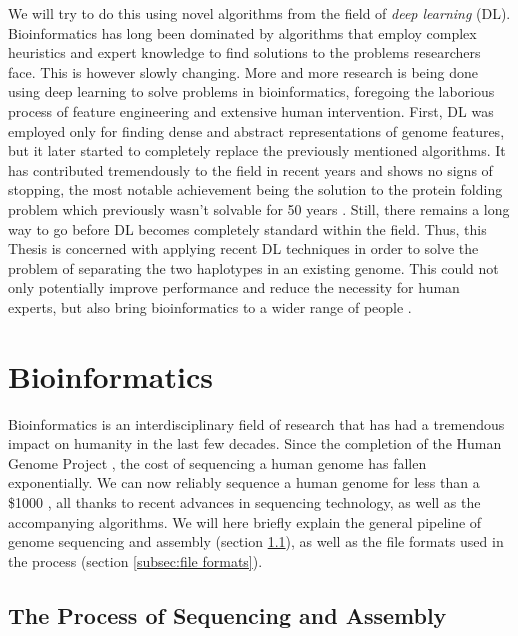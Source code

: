 \documentclass[times, utf8, diplomski, english]{fer_eng}
\begin{document}
We will try to do this using novel algorithms from the field of \textit{deep learning} (DL). Bioinformatics has long been dominated by algorithms that employ complex heuristics and expert knowledge to find solutions to the problems researchers face. This is however slowly changing. More and more research is being done using deep learning to solve problems in bioinformatics, foregoing the laborious process of feature engineering and extensive human intervention. First, DL was employed only for finding dense and abstract representations of genome features, but it later started to completely replace the previously mentioned algorithms. It has contributed tremendously to the field in recent years and shows no signs of stopping, the most notable achievement being the solution to the protein folding problem which previously wasn't solvable for 50 years \cite{alphafold}. Still, there remains a long way to go before DL becomes completely standard within the field. Thus, this Thesis is concerned with applying recent DL techniques in order to solve the problem of separating the two haplotypes in an existing genome. This could not only potentially improve performance and reduce the necessity for human experts, but also bring bioinformatics to a wider range of people \cite{dl_bioinformatics}.

\section{Bioinformatics}

Bioinformatics is an interdisciplinary field of research that has had a tremendous impact on humanity in the last few decades. Since the completion of the Human Genome Project \cite{HGP1} \cite{HGP2}, the cost of sequencing a human genome has fallen exponentially. We can now reliably sequence a human genome for less than a \$1000 \cite{genome_cost}, all thanks to recent advances in sequencing technology, as well as the accompanying algorithms. We will here briefly explain the general pipeline of genome sequencing and assembly (section \ref{subsec:the process of sequencing and assembly}), as well as the file formats used in the process (section \ref{subsec:file formats}).

\subsection{The Process of Sequencing and Assembly}
\label{subsec:the process of sequencing and assembly}
\end{document}
